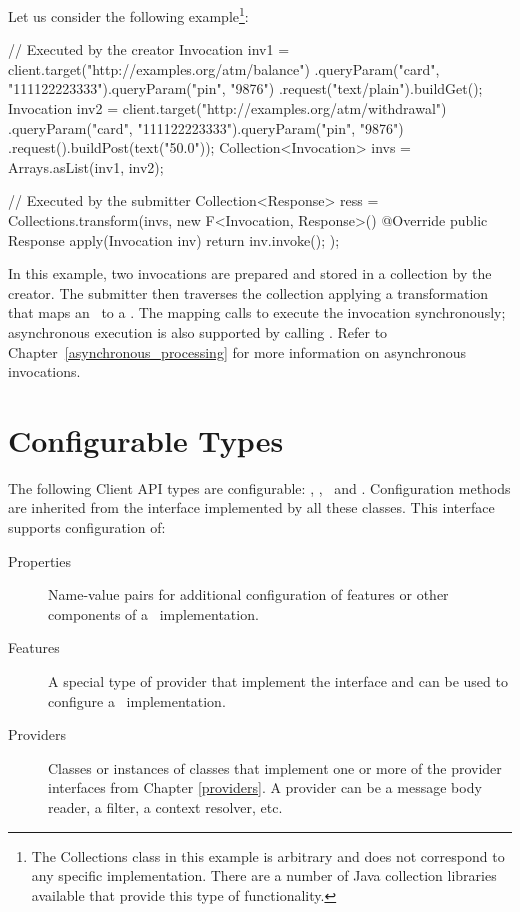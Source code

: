  Let us consider the following example\footnote{The Collections class in this example is arbitrary and does not correspond to any specific implementation. There are a number of Java collection libraries available that provide this type of functionality.}:

\begin{listing}{1}
// Executed by the creator
Invocation inv1 = client.target("http://examples.org/atm/balance")
    .queryParam("card", "111122223333").queryParam("pin", "9876")
    .request("text/plain").buildGet();
Invocation inv2 = client.target("http://examples.org/atm/withdrawal")
    .queryParam("card", "111122223333").queryParam("pin", "9876")
    .request().buildPost(text("50.0"));
Collection<Invocation> invs = Arrays.asList(inv1, inv2);

// Executed by the submitter
Collection<Response> ress =
    Collections.transform(invs,
        new F<Invocation, Response>() {
             @Override
             public Response apply(Invocation inv) {
                 return inv.invoke(); } });
\end{listing}

In this example, two invocations are prepared and stored in a collection by the creator. The submitter then traverses the collection applying a transformation that maps an \Invocation\ to a \Response. The mapping calls  to execute the invocation synchronously; asynchronous execution is also supported by calling . Refer to
Chapter~\ref{asynchronous_processing} for more information on asynchronous invocations.

\section{Configurable Types}
\label{configurable_types}

The following Client API types are configurable: \Client, \Invocation, \InvocationBuilder\ and \WebTarget. Configuration methods are inherited from the  interface implemented by all these classes. This interface supports configuration of:

\begin{description}
\item [Properties] Name-value pairs for additional configuration of features or other components of a \jaxrs\ implementation.
\item [Features] A special type of provider that implement the  interface and can be used to configure a \jaxrs\ implementation.
\item [Providers] Classes or instances of classes that implement one or more of the provider interfaces from Chapter \ref{providers}. A provider can be a message body reader, a filter, a context resolver, etc. 
\end{description}

